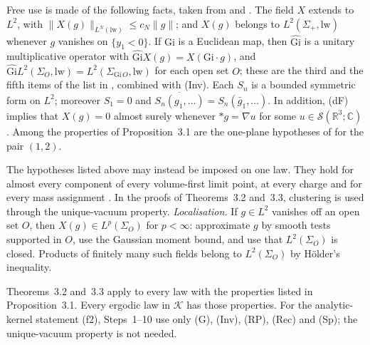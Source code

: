 \documentclass[11pt,letterpaper,reqno]{amsart}
\theoremstyle{definition}
\begin{document}
Free use is made of the following facts, taken from \cite[Lemma~14.3\,(a), (b)]{QEDII} and \cite[Section~8.1.2]{QEDI}.
The field $X$ extends to $L^2$, with $\|X(g)\|_{L^N(\mathrm{lw})}\le c_N\|g\|$; and $X(g)$ belongs to $L^2(\Sigma_+,\mathrm{lw})$ whenever $g$ vanishes on $\{y_1<0\}$.
If $\mathrm{Gi}$ is a Euclidean map, then $\widehat{\mathrm{Gi}}$ is a unitary multiplicative operator with $\widehat{\mathrm{Gi}}X(g)=X(\mathrm{Gi}\cdot g)$, and $\widehat{\mathrm{Gi}}L^2(\Sigma_O,\allowbreak \mathrm{lw})=\allowbreak L^2(\Sigma_{\mathrm{Gi}\,O},\allowbreak \mathrm{lw})$ for each open set $O$; these are the third and the fifth items of the list in \cite{QEDI}, combined with (Inv).
Each $S_n$ is a bounded symmetric form on $L^2$; moreover $S_1=0$ and $\overline{S_n(g_1,\dots)}=S_n(\bar g_1,\dots)$.
In addition, (dF) implies that $X(g)=0$ almost surely whenever $\ast g=\nabla u$ for some $u\in\mathcal S(\mathbb R^3;\mathbb C)$ \cite[Definition~14.2\,(a)]{QEDII}.
Among the properties of Proposition~3.1 are the one-plane hypotheses of \cite[Definition~14.2\,(f)]{QEDII} for the pair $(1,2)$.


The hypotheses listed above may instead be imposed on one law.
They hold for almost every component of every volume-first limit
point, at every charge and for every mass assignment
\cite[Theorems~1.3 and~1.4]{QEDII}. In the proofs of Theorems~3.2
and~3.3, clustering is used through the unique-vacuum property.
\emph{Localisation.} If $g\in L^2$ vanishes off an open set $O$,
then $X(g)\in L^p(\Sigma_O)$ for $p<\infty$: approximate $g$ by smooth
tests supported in $O$, use the Gaussian moment bound, and use that
$L^2(\Sigma_O)$ is closed. Products of finitely many such fields
belong to $L^2(\Sigma_O)$ by H\"older's inequality.

Theorems~3.2 and~3.3 apply to every law with the properties listed in
Proposition~3.1. Every ergodic law in $\mathcal K$ has those properties.
For the analytic-kernel statement (f2), Steps~1--10 use only (G),
(Inv), (RP), (Rec) and (Sp); the unique-vacuum property is not needed.
\end{document}
